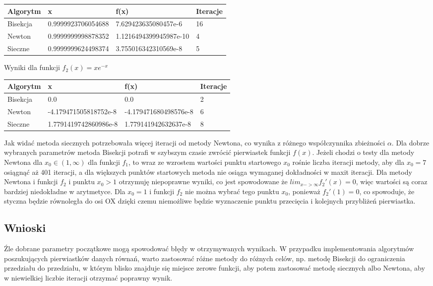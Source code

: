 \documentclass{article}
\begin{document}
\vspace{8pt}
\setlength{\tabcolsep}{2pt}
\renewcommand{\arraystretch}{1.6}
\begin{tabularx}{\textwidth}{|l|Y|Y|l|}
\hline
Algorytm & x & f(x) & Iteracje \\
\hline
Bisekcja & 0.9999923706054688 & 7.629423635080457e-6 & 16 \\
\hline
Newton & 0.9999999998878352 & 1.1216494399945987e-10 & 4 \\
\hline
Sieczne & 0.9999999624498374 & 3.755016342310569e-8 & 5 \\
\hline
\end{tabularx}
\vspace{15pt}

Wyniki dla funkcji $f_2(x) = xe^{-x}$ \\

\vspace{7pt}
\setlength{\tabcolsep}{2pt}
\renewcommand{\arraystretch}{1.6}
\begin{tabularx}{\textwidth}{|l|Y|Y|l|}
\hline
Algorytm & x & f(x) & Iteracje \\
\hline
Bisekcja & 0.0 & 0.0 & 2 \\
\hline
Newton & -4.179471505818752e-8 & -4.179471680498576e-8 & 6 \\
\hline
Sieczne & 1.7791419742860986e-8 & 1.779141942632637e-8 & 8 \\
\hline
\end{tabularx}
\vspace{10pt}

Jak widać metoda siecznych potrzebowała więcej iteracji od metody Newtona, co wynika z różnego współczynnika zbieżności $\alpha$. Dla dobrze wybranych parametrów metoda Bisekcji potrafi w szybszym czasie zwrócić pierwiastek funkcji $f(x)$. Jeżeli chodzi o testy dla metody Newtona dla $x_0 \in (1,\infty)$ dla funkcji $f_1$, to wraz ze wzrostem wartości punktu startowego $x_0$ rośnie liczba iteracji metody, aby dla $x_0 = 7$ osiągnąć aż 401 iteracji, a dla większych punktów startowych metoda nie osiąga wymaganej dokładności w maxit iteracji. Dla metody Newtona i funkcji $f_2$ i punktu $x_0 > 1$ otrzymuję niepoprawne wyniki, co jest spowodowane że $lim_{x -> \infty}{f_2'(x)} = 0$, więc wartości są coraz bardziej niedokładne w arytmetyce. Dla $x_0 = 1$ i funkcji $f_2$ nie można wybrać tego punktu $x_0$, ponieważ $f_2'(1) = 0$, co spowoduje, że styczna będzie równoległa do osi OX dzięki czemu niemożliwe będzie wyznaczenie punktu przecięcia i kolejnych przybliżeń pierwiastka.
\newpage

\subsection{Wnioski}
Źle dobrane parametry początkowe mogą spowodować błędy w otrzymywanych wynikach. W przypadku implementowania algorytmów poszukujących pierwiastków danych równań, warto zastosować różne metody do różnych celów, np. metodę Bisekcji do ograniczenia przedziału do przedziału, w którym blisko znajduje się miejsce zerowe funkcji, aby potem zastosować metodę siecznych albo Newtona, aby w niewielkiej liczbie iteracji otrzymać poprawny wynik.
\end{document}
